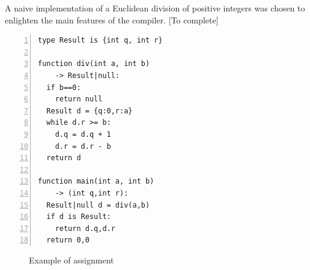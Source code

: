\documentclass[10pt,a4paper]{article}
\begin{document}
A naive implementation of a Euclidean division of positive integers was chosen to enlighten the main features of the compiler. [To complete]

\newbox\wcode
\begin{lrbox}{\wcode}
\begin{minipage}[t]{.45\textwidth}
\begin{lstlisting}[language=Whiley, frame=single, showlines=true, numbers=left]
type Result is {int q, int r}

function div(int a, int b) 
    -> Result|null:
  if b==0:
    return null
  Result d = {q:0,r:a}
  while d.r >= b:
    d.q = d.q + 1
    d.r = d.r - b
  return d

function main(int a, int b) 
    -> (int q,int r):
  Result|null d = div(a,b)
  if d is Result:
    return d.q,d.r
  return 0,0
\end{lstlisting}
\end{minipage}
\end{lrbox}

\begin{figure}[H]
\centering
{}
\quad {}

\caption {Example of assignment}
\end{figure}
\end{document}
